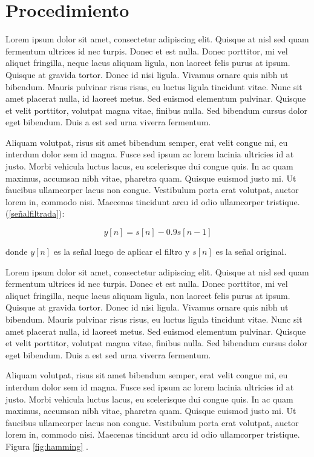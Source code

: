 \section{Procedimiento}
Lorem ipsum dolor sit amet, consectetur adipiscing elit. Quisque at nisl sed quam fermentum ultrices id nec turpis. Donec et est nulla. Donec porttitor, mi vel aliquet fringilla, neque lacus aliquam ligula, non laoreet felis purus at ipsum. Quisque at gravida tortor. Donec id nisi ligula. Vivamus ornare quis nibh ut bibendum. Mauris pulvinar risus risus, eu luctus ligula tincidunt vitae. Nunc sit amet placerat nulla, id laoreet metus. Sed euismod elementum pulvinar. Quisque et velit porttitor, volutpat magna vitae, finibus nulla. Sed bibendum cursus dolor eget bibendum. Duis a est sed urna viverra fermentum.

Aliquam volutpat, risus sit amet bibendum semper, erat velit congue mi, eu interdum dolor sem id magna. Fusce sed ipsum ac lorem lacinia ultricies id at justo. Morbi vehicula luctus lacus, eu scelerisque dui congue quis. In ac quam maximus, accumsan nibh vitae, pharetra quam. Quisque euismod justo mi. Ut faucibus ullamcorper lacus non congue. Vestibulum porta erat volutpat, auctor lorem in, commodo nisi. Maecenas tincidunt arcu id odio ullamcorper tristique.(\ref{señalfiltrada}):

\begin{equation} \label{señalfiltrada}
    y[n] = s[n]-0.9 s[n-1]
\end{equation}

donde $y[n]$ es la señal luego de aplicar el filtro y $s[n]$ es la señal original.

Lorem ipsum dolor sit amet, consectetur adipiscing elit. Quisque at nisl sed quam fermentum ultrices id nec turpis. Donec et est nulla. Donec porttitor, mi vel aliquet fringilla, neque lacus aliquam ligula, non laoreet felis purus at ipsum. Quisque at gravida tortor. Donec id nisi ligula. Vivamus ornare quis nibh ut bibendum. Mauris pulvinar risus risus, eu luctus ligula tincidunt vitae. Nunc sit amet placerat nulla, id laoreet metus. Sed euismod elementum pulvinar. Quisque et velit porttitor, volutpat magna vitae, finibus nulla. Sed bibendum cursus dolor eget bibendum. Duis a est sed urna viverra fermentum.

Aliquam volutpat, risus sit amet bibendum semper, erat velit congue mi, eu interdum dolor sem id magna. Fusce sed ipsum ac lorem lacinia ultricies id at justo. Morbi vehicula luctus lacus, eu scelerisque dui congue quis. In ac quam maximus, accumsan nibh vitae, pharetra quam. Quisque euismod justo mi. Ut faucibus ullamcorper lacus non congue. Vestibulum porta erat volutpat, auctor lorem in, commodo nisi. Maecenas tincidunt arcu id odio ullamcorper tristique. Figura \ref{fig:hamming} \cite{rabinerlargo}.

